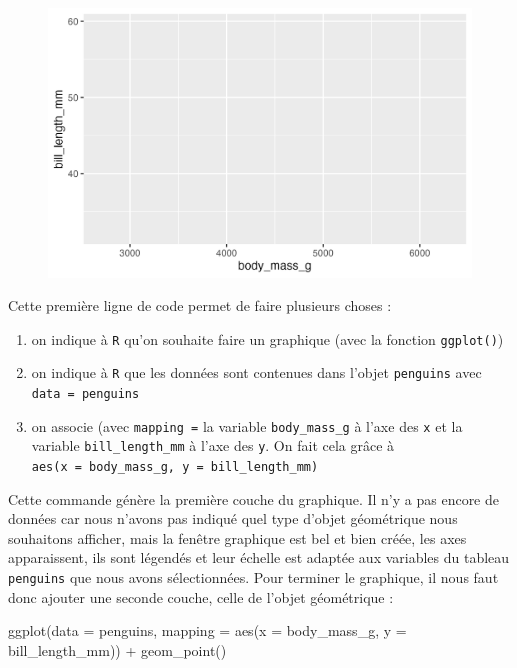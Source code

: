 \documentclass[
  letterpaper,
  DIV=11,
  numbers=noendperiod]{scrreprt}
\newenvironment{Shaded}{\begin{snugshade}}{\end{snugshade}}
\newcommand{\AttributeTok}[1]{\textcolor[rgb]{0.40,0.45,0.13}{#1}}
\newcommand{\FunctionTok}[1]{\textcolor[rgb]{0.28,0.35,0.67}{#1}}
\newcommand{\NormalTok}[1]{\textcolor[rgb]{0.00,0.23,0.31}{#1}}
\newcommand{\SpecialCharTok}[1]{\textcolor[rgb]{0.37,0.37,0.37}{#1}}
\providecommand{\tightlist}{%
  \setlength{\itemsep}{0pt}\setlength{\parskip}{0pt}}\usepackage{longtable,booktabs,array}
\begin{document}
\begin{figure}[H]

{\centering \includegraphics{./03-visualization_files/figure-pdf/unnamed-chunk-5-1.png}

}

\end{figure}

Cette première ligne de code permet de faire plusieurs choses :

\begin{enumerate}
\def\labelenumi{\arabic{enumi}.}
\tightlist
\item
  on indique à \texttt{R} qu'on souhaite faire un graphique (avec la
  fonction \texttt{ggplot()})
\item
  on indique à \texttt{R} que les données sont contenues dans l'objet
  \texttt{penguins} avec \texttt{data\ =\ penguins}
\item
  on associe (avec \texttt{mapping\ =} la variable
  \texttt{body\_mass\_g} à l'axe des \texttt{x} et la variable
  \texttt{bill\_length\_mm} à l'axe des \texttt{y}. On fait cela grâce à
  \texttt{aes(x\ =\ body\_mass\_g,\ y\ =\ bill\_length\_mm)}
\end{enumerate}

Cette commande génère la première couche du graphique. Il n'y a pas
encore de données car nous n'avons pas indiqué quel type d'objet
géométrique nous souhaitons afficher, mais la fenêtre graphique est bel
et bien créée, les axes apparaissent, ils sont légendés et leur échelle
est adaptée aux variables du tableau \texttt{penguins} que nous avons
sélectionnées. Pour terminer le graphique, il nous faut donc ajouter une
seconde couche, celle de l'objet géométrique :

\begin{Shaded}
\begin{Highlighting}[]
\FunctionTok{ggplot}\NormalTok{(}\AttributeTok{data =}\NormalTok{ penguins, }\AttributeTok{mapping =} \FunctionTok{aes}\NormalTok{(}\AttributeTok{x =}\NormalTok{ body\_mass\_g, }\AttributeTok{y =}\NormalTok{ bill\_length\_mm)) }\SpecialCharTok{+}
  \FunctionTok{geom\_point}\NormalTok{()}
\end{Highlighting}
\end{Shaded}
\end{document}
